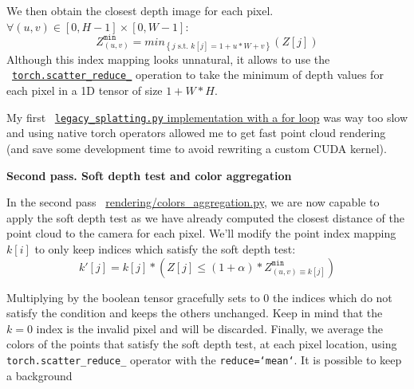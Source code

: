 We then obtain the closest depth image for each pixel. $\forall (u,v) \in \left[0, H-1\right] \times \left[0, W-1\right]$:
$$Z^{\texttt{min}}_{(u,v)} = min_{\left\{j  \text{ s.t. } k[j]=1+u*W+v\right\}} \left(Z[j]\right)$$
\noindent Although this index mapping looks unnatural, it allows to use the ~\href{https://pytorch.org/docs/stable/generated/torch.Tensor.scatter\_reduce\_.html#torch.Tensor.scatter\_reduce\_}{\texttt{torch.scatter\_reduce\_}} operation to take the minimum of depth values for each pixel in a 1D tensor of size $1+W*H$.

My first ~\href{https://github.com/balthazarneveu/per-pixel-point-rendering/blob/main/src/pixr/rendering/legacy\_splatting.py}{\texttt{legacy\_splatting.py} implementation with a for loop} was way too slow and using native torch operators allowed me to get fast point cloud rendering (and save some development time to avoid rewriting a custom CUDA kernel).

\noindent \textbf{Second pass. Soft depth test and color aggregation}

In the second pass  ~\href{https://github.com/balthazarneveu/per-pixel-point-rendering/blob/main/src/pixr/rendering/colors\_aggregation.py}{rendering/colors\_aggregation.py}, we are now capable to apply the soft depth test as we have already computed the closest distance of the point cloud to the camera for each pixel. We'll modify the point index mapping $k[i]$ to only keep indices which satisfy the soft depth test: 
$$ k'[j] = k[j] * \left(Z[j] \leq (1+\alpha) *Z^{\texttt{min}}_{(u,v) \equiv k[j]}\right)$$

\noindent Multiplying by the boolean tensor gracefully sets to 0 the indices which do not satisfy the condition and keeps the others unchanged. Keep in mind that the $k=0$ index is the invalid pixel and will be discarded.
Finally, we average the colors of the points that satisfy the soft depth test, at each pixel location, using \texttt{torch.scatter\_reduce\_} operator with the \texttt{reduce=`mean`}. It is possible to keep a background

